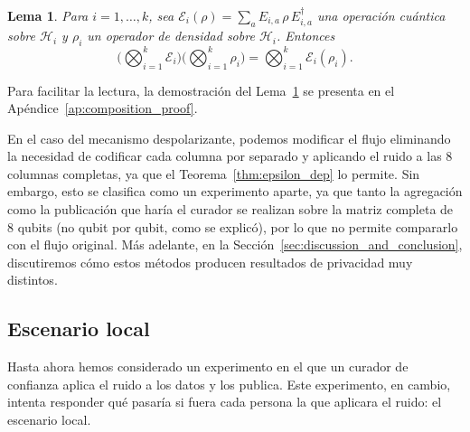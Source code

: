 \documentclass{ieeeaccess}
\newtheorem{lemma}{Lema}[section]
\begin{document}
\begin{lemma}
  Para $i = 1, \dots, k$, sea $\mathcal{E}_i(\rho) = \sum_{a} E_{i,a}\, \rho\, E_{i,a}^{\dagger}$ una operación cuántica sobre $\mathcal{H}_i$ y $\rho_i$ un operador de densidad sobre $\mathcal{H}_i$. Entonces
  \[
    \Big(\bigotimes_{i=1}^{k} \mathcal{E}_i\Big)\Big(\bigotimes_{i=1}^{k} \rho_i\Big) = \bigotimes_{i=1}^{k} \mathcal{E}_i(\rho_i).
  \]
  \label{lem:product_channel}
\end{lemma}

Para facilitar la lectura, la demostración del Lema~\ref{lem:product_channel} se presenta en el Apéndice~\ref{ap:composition_proof}.

En el caso del mecanismo despolarizante, podemos modificar el flujo eliminando la necesidad de codificar cada columna por separado y aplicando el ruido a las 8 columnas completas, ya que el Teorema~\ref{thm:epsilon_dep} lo permite. Sin embargo, esto se clasifica como un experimento aparte, ya que tanto la agregación como la publicación que haría el curador se realizan sobre la matriz completa de 8 qubits (no qubit por qubit, como se explicó), por lo que no permite compararlo con el flujo original. Más adelante, en la Sección~\ref{sec:discussion_and_conclusion}, discutiremos cómo estos métodos producen resultados de privacidad muy distintos.


\subsection{Escenario local}
\label{subsec:experiment_local_setting}

Hasta ahora hemos considerado un experimento en el que un curador de confianza aplica el ruido a los datos y los publica. Este experimento, en cambio, intenta responder qué pasaría si fuera cada persona la que aplicara el ruido: el escenario local.
\end{document}
